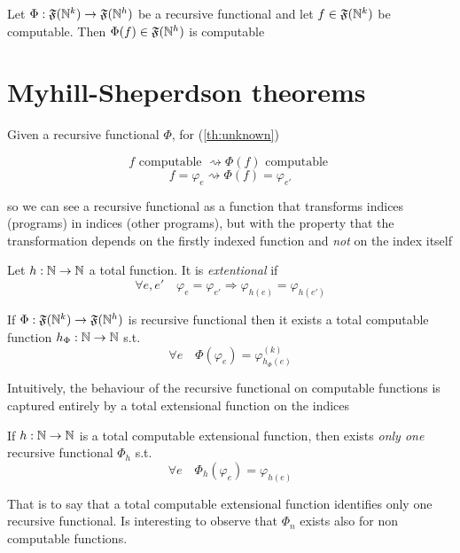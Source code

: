 \begin{theorem}\label{th:unknown}
  Let $\Phi : \mathfrak{F}(\mathbb{N}^k) \rightarrow \mathfrak{F}(\mathbb{N}^h)$
  be a recursive functional and let $f \in \mathfrak{F}(\mathbb{N}^k)$ be
  computable. Then $\Phi(f) \in \mathfrak{F}(\mathbb{N}^h)$ is computable
\end{theorem}

\section{Myhill-Sheperdson theorems}
Given a recursive functional $\Phi$, for (\ref{th:unknown})

\[
  f \mbox{ computable } \rightsquigarrow \Phi(f) \mbox{ computable }
\]
\[
  f = \varphi_e \rightsquigarrow \Phi(f) = \varphi_{e'}
\]

so we can see a recursive functional as a function that transforms
indices (programs) in indices (other programs), but with the property
that the transformation depends on the firstly indexed function and
\emph{not} on the index itself

\begin{definition}
  Let $h : \mathbb{N} \rightarrow \mathbb{N}$ a total function. It is \emph{extentional} if
  \[
    \forall e,e' \quad \varphi_e = \varphi_{e'} \Rightarrow
    \varphi_{h(e)} = \varphi_{h(e')}
  \]
\end{definition}

\begin{theorem}
  If $\Phi : \mathfrak{F}(\mathbb{N}^k) \rightarrow \mathfrak{F}(\mathbb{N}^h)$ is
  recursive functional then it exists a total computable function
  $h_\Phi : \mathbb{N} \rightarrow \mathbb{N}$ s.t.
  \[
    \forall e \quad \Phi(\varphi_e) = \varphi_{h_\Phi(e)}^{(k)}
  \]
\end{theorem}

Intuitively, the behaviour of the recursive functional on computable
functions is captured entirely by a total extensional function on the
indices

\begin{theorem}\label{th:myhill-shepherdson2}
  If $h : \mathbb{N} \rightarrow \mathbb{N}$ is a total computable extensional function, then
  exists \emph{only one} recursive functional $\Phi_h$ s.t.
  \[
    \forall e \quad \Phi_h(\varphi_e) = \varphi_{h(e)}
  \]
\end{theorem}
That is to say that a total computable extensional function identifies
only one recursive functional.  Is interesting to observe that
$\Phi_n$ exists also for non computable functions.

